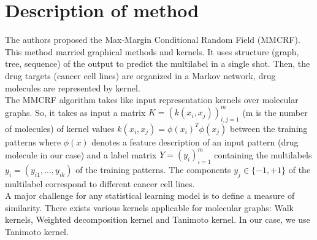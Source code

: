 \documentclass[12pt]{article}
\begin{document}
\section{Description of method}
The authors proposed the Max-Margin Conditional Random Field (MMCRF). This method married graphical methods and kernels. It uses structure (graph, tree, sequence) of the output to predict the multilabel in a single shot. Then, the drug targets (cancer cell lines) are organized in a Markov network, drug molecules are represented by kernel.\\
The MMCRF algorithm takes like input representation kernels over molecular graphs. So, it takes as input
a matrix $K = (k(x_i,x_j))_{i,j=1}^m$ (m is the number of molecules) of kernel values $k(x_i,x_j) = \phi(x_i)^T\phi(x_j)$ between the training patterns where $\phi(x)$ denotes a feature description of an input pattern (drug molecule in our case) and a label matrix $Y = (y_i)_{i=1}^m$ containing the multilabels $y_i = (y_{i1},...,y_{ik})$ of the training patterns. The components $y_{j} \in \{-1,+1\}$ of the multilabel correspond to different cancer cell lines.\\
A major challenge for any statistical learning model is to define a measure of similarity.
There exists various kernels applicable for molecular graphs: Walk kernels, Weighted decomposition kernel and Tanimoto kernel. In our case, we use Tanimoto kernel.
\end{document}
